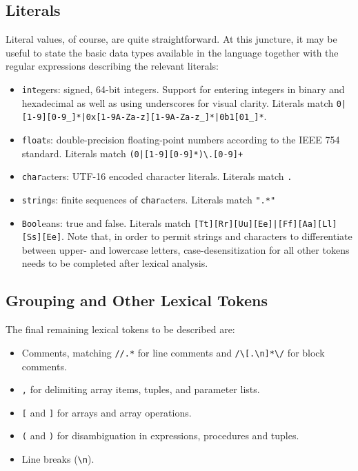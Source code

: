 \documentclass{article}
\newcommand{\code}[1]{\colorbox{gray!20}{\texttt{#1}}}
\begin{document}
    \subsection{Literals}
    Literal values, of course, are quite straightforward. At this juncture, it may be useful to state the basic data types available in the language together with the regular expressions describing the relevant literals:
    \begin{itemize}
        \item \code{int}egers: signed, 64-bit integers. Support for entering integers in binary and hexadecimal as well as using underscores for visual clarity.\newline 
              Literals match \code{0|[1-9][0-9\_]*|0x[1-9A-Za-z][1-9A-Za-z\_]*|0b1[01\_]*}.
        \item \code{float}s: double-precision floating-point numbers according to the IEEE 754 standard. \newline
              Literals match \code{(0|[1-9][0-9]*)\textbackslash.[0-9]+}
        \item \code{char}acters: UTF-16 encoded character literals. \newline
              Literals match \code{\textquotesingle.\textquotesingle}
        \item \code{string}s: finite sequences of \code{char}acters. \newline
              Literals match \code{".*"}
        \item \code{Bool}eans: true and false. \newline
              Literals match \code{[Tt][Rr][Uu][Ee]|[Ff][Aa][Ll][Ss][Ee]}. Note that, in order to permit strings and characters to differentiate between upper- and lowercase letters, case-desensitization for all other tokens needs to be completed after lexical analysis.
    \end{itemize}

    \subsection{Grouping and Other Lexical Tokens}
    The final remaining lexical tokens to be described are:
    \begin{itemize}
        \item Comments, matching \code{//.*} for line comments and \code{/\textbackslash*[.\textbackslash n]*\textbackslash*/} for block comments.
        \item \code{,} for delimiting array items, tuples, and parameter lists.
        \item \code{[} and \code{]} for arrays and array operations.
        \item \code{(} and \code{)} for disambiguation in expressions, procedures and tuples.
        \item Line breaks (\code{\textbackslash n}).
    \end{itemize}
\end{document}
